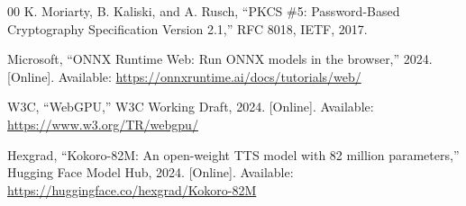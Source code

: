 \documentclass[conference]{IEEEtran}
\begin{document}
\begin{thebibliography}{00}
 K. Moriarty, B. Kaliski, and A. Rusch, ``PKCS \#5:
Password-Based Cryptography Specification Version 2.1,'' RFC 8018, IETF, 2017.

 Microsoft, ``ONNX Runtime Web: Run ONNX models in the
browser,'' 2024. [Online]. Available: \url{https://onnxruntime.ai/docs/tutorials/web/}

 W3C, ``WebGPU,'' W3C Working Draft, 2024. [Online].
Available: \url{https://www.w3.org/TR/webgpu/}

 Hexgrad, ``Kokoro-82M: An open-weight TTS model with 82
million parameters,'' Hugging Face Model Hub, 2024. [Online]. Available:
\url{https://huggingface.co/hexgrad/Kokoro-82M}

\end{thebibliography}
\end{document}

